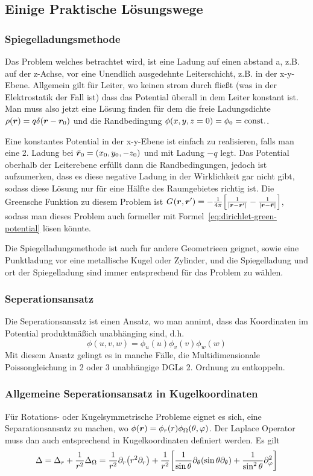 \subsection{Einige Praktische Lösungswege}%
\label{sub:spiegelladungsmethode}
\subsubsection{Spiegelladungsmethode}%
Das Problem welches betrachtet wird, ist eine Ladung auf einen abstand a, z.B.
auf der z-Achse, vor eine Unendlich ausgedehnte Leiterschicht, z.B. in der 
x-y-Ebene. Allgemein gilt für Leiter, wo keinen strom durch fließt (was
in der Elektrostatik der Fall ist) dass das Potential überall in dem Leiter
konstant ist. Man muss also jetzt eine Lösung finden für dem die freie 
Ladungsdichte $\rho(\vb*r)=q\delta(\vb*r-\vb*r_0)$ und die Randbedingung 
$\phi(x,y,z=0)=\phi_0=\mathrm{const.}$. 

Eine konstantes Potential in der x-y-Ebene
ist einfach zu realisieren, falls man eine 2. Ladung bei $\bar{\vb*r}_0=
(x_0,y_0,-z_0)$ und mit Ladung $-q$ legt. Das Potential oberhalb der 
Leiterebene erfüllt dann die Randbedingungen, jedoch ist aufzumerken, dass
es diese negative Ladung in der Wirklichkeit gar nicht gibt, sodass diese 
Lösung nur für eine Hälfte des Raumgebietes richtig ist. Die Greensche
Funktion zu diesem Problem ist $G_{}(\vb*r,\vb*r')=-\frac{1}{4\pi} \qty[\frac{1}{\abs{\vb*r-\vb*r'}}-\frac{1}{\abs{\vb*r-\bar{\vb*r}}}]$, sodass man dieses Problem auch formeller mit 
Formel~\ref{eq:dirichlet-green-potential} lösen könnte.

Die Spiegelladungsmethode ist auch fur andere Geometrieen geignet, sowie
eine Punktladung vor eine metallische Kugel oder Zylinder, und die
Spiegelladung und ort der Spiegelladung sind immer entsprechend für das
Problem zu wählen.

\subsubsection{Seperationsansatz}%
Die Seperationsansatz ist einen Ansatz, wo man annimt, dass das Koordinaten
im Potential produktmäßich unabhänging sind, d.h.
\begin{equation*}
  \phi(u,v,w)=\phi_u(u)\phi_v(v)\phi_w(w)
\end{equation*}
Mit diesem Ansatz gelingt es in manche Fälle, die Multidimensionale 
Poissongleichung in 2 oder 3 unabhängige DGLs 2. Ordnung zu entkoppeln.

\subsubsection{Allgemeine Seperationsansatz in Kugelkoordinaten}%
Für Rotations- oder Kugelsymmetrische Probleme eignet es sich, eine 
Separationsansatz zu machen, wo 
$\phi(\vb*r)=\phi_r(r)\phi_\Omega(\theta,\varphi)$.
Der Laplace Operator muss dan auch entsprechend in Kugelkoordinaten definiert
werden. Es gilt 
\begin{equation}
  \Delta=\Delta_r + \frac{1}{r^2}\Delta_\Omega=
  \frac{1}{r^2}\partial_{r} \qty(r^2\partial_{r}) + 
  \frac{1}{r^2}\qty[\frac{1}{\sin\theta}\partial_{\theta}\qty(\sin\theta\partial_{\theta})+
  \frac{1}{\sin^2\theta}\partial_{\varphi}^2] 
\end{equation}

